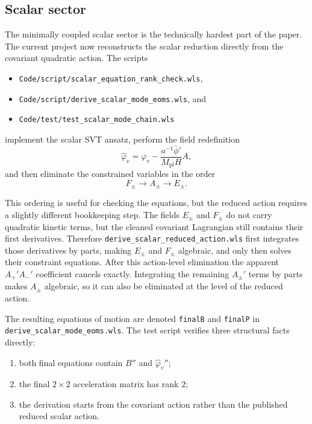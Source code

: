 \documentclass[11pt]{article}
\newcommand{\Mpl}{M_{\mathrm{pl}}}
\begin{document}
\subsection{Scalar sector}
The minimally coupled scalar sector is the technically hardest part of the paper. The current project now reconstructs the scalar reduction directly from the covariant quadratic action. The scripts
\begin{itemize}[leftmargin=1.5em]
\item \texttt{Code/script/scalar\_equation\_rank\_check.wls},
\item \texttt{Code/script/derive\_scalar\_mode\_eoms.wls}, and
\item \texttt{Code/test/test\_scalar\_mode\_chain.wls}
\end{itemize}
implement the scalar SVT ansatz, perform the field redefinition
\begin{equation}
\hat{\varphi}_v = \varphi_v - \frac{a^{-1}\bar\phi'}{\Mpl H} A,
\end{equation}
and then eliminate the constrained variables in the order
\begin{equation}
F_\pm \longrightarrow A_\pm \longrightarrow E_\pm.
\end{equation}

This ordering is useful for checking the equations, but the reduced action requires a slightly different bookkeeping step. The fields $E_\pm$ and $F_\pm$ do not carry quadratic kinetic terms, but the cleaned covariant Lagrangian still contains their first derivatives. Therefore \texttt{derive\_scalar\_reduced\_action.wls} first integrates those derivatives by parts, making $E_\pm$ and $F_\pm$ algebraic, and only then solves their constraint equations. After this action-level elimination the apparent $A_+'A_-'$ coefficient cancels exactly. Integrating the remaining $A_\pm'$ terms by parts makes $A_\pm$ algebraic, so it can also be eliminated at the level of the reduced action.

The resulting equations of motion are denoted \texttt{finalB} and \texttt{finalP} in \texttt{derive\_scalar\_mode\_eoms.wls}. The test script verifies three structural facts directly:
\begin{enumerate}[leftmargin=1.5em]
\item both final equations contain $B''$ and $\hat\varphi_v''$;
\item the final $2\times2$ acceleration matrix has rank $2$;
\item the derivation starts from the covariant action rather than the published reduced scalar action.
\end{enumerate}
\end{document}
